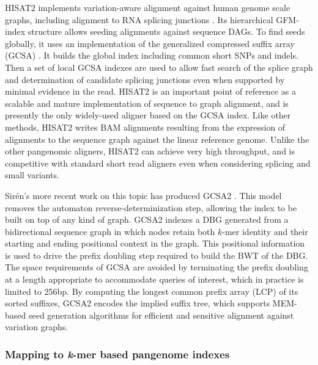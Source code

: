 \documentclass[a4paper,12pt,numbered,oneside]{Classes/PhDThesisPSnPDF}
\begin{document}
HISAT2 implements variation-aware alignment against human genome scale graphs, including alignment to RNA splicing junctions \cite{kim2017hisat2}.
Its hierarchical GFM-index structure allows seeding alignments against sequence DAGs.
To find seeds globally, it uses an implementation of the generalized compressed suffix array (GCSA) \cite{siren2011indexing}.
It builds the global index including common short SNPs and indels.
Then a set of local GCSA indexes are used to allow fast search of the splice graph and determination of candidate splicing junctions even when supported by minimal evidence in the read.
HISAT2 is an important point of reference as a scalable and mature implementation of sequence to graph alignment, and is presently the only widely-used aligner based on the GCSA index.
Like other methods, HISAT2 writes BAM alignments resulting from the expression of alignments to the sequence graph against the linear reference genome.
Unlike the other pangenomic aligners, HISAT2 can achieve very high throughput, and is competitive with standard short read aligners even when considering splicing and small variants.

Sir\'{e}n's more recent work on this topic has produced GCSA2 \cite{siren2017indexing}.
This model removes the automaton reverse-determinization step, allowing the index to be built on top of any kind of graph.
GCSA2 indexes a DBG generated from a bidirectional sequence graph in which nodes retain both $k$-mer identity and their starting and ending positional context in the graph.
This positional information is used to drive the prefix doubling step required to build the BWT of the DBG.
The space requirements of GCSA are avoided by terminating the prefix doubling at a length appropriate to accommodate queries of interest, which in practice is limited to 256bp.
By computing the longest common prefix array (LCP) of its sorted suffixes, GCSA2 encodes the implied suffix tree, which supports MEM-based seed generation algorithms for efficient and sensitive alignment against variation graphs.

\subsubsection{Mapping to \emph{k}-mer based pangenome indexes}
\end{document}
